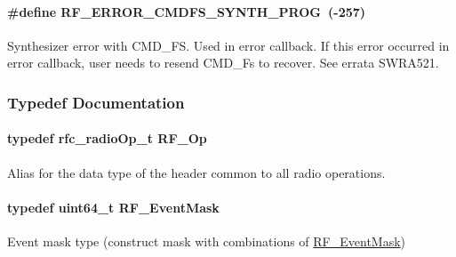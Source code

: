 \paragraph[{R\+F\+\_\+\+E\+R\+R\+O\+R\+\_\+\+C\+M\+D\+F\+S\+\_\+\+S\+Y\+N\+T\+H\+\_\+\+P\+R\+O\+G}]{\setlength{\rightskip}{0pt plus 5cm}\#define R\+F\+\_\+\+E\+R\+R\+O\+R\+\_\+\+C\+M\+D\+F\+S\+\_\+\+S\+Y\+N\+T\+H\+\_\+\+P\+R\+O\+G~(-\/257)}\label{_r_f_8h_a40a0b1b81a2bebefb91b952d750634dc}


Synthesizer error with C\+M\+D\+\_\+\+F\+S. Used in error callback. If this error occurred in error callback, user needs to resend C\+M\+D\+\_\+\+Fs to recover. See errata S\+W\+R\+A521. 



\subsubsection{Typedef Documentation}
\paragraph[{R\+F\+\_\+\+Op}]{\setlength{\rightskip}{0pt plus 5cm}typedef rfc\+\_\+radio\+Op\+\_\+t {\bf R\+F\+\_\+\+Op}}\label{_r_f_8h_a47ea3dea78019340e8f8ceb854de5f02}


Alias for the data type of the header common to all radio operations. 

\paragraph[{R\+F\+\_\+\+Event\+Mask}]{\setlength{\rightskip}{0pt plus 5cm}typedef uint64\+\_\+t {\bf R\+F\+\_\+\+Event\+Mask}}\label{_r_f_8h_a128c46e18dbbaa781abb7abafc35233a}


Event mask type (construct mask with combinations of \hyperlink{_r_f_8h_a128c46e18dbbaa781abb7abafc35233a}{R\+F\+\_\+\+Event\+Mask}) 


